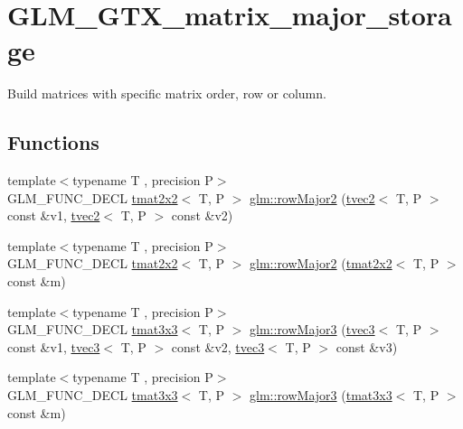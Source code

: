 \hypertarget{group__gtx__matrix__major__storage}{}\section{G\+L\+M\+\_\+\+G\+T\+X\+\_\+matrix\+\_\+major\+\_\+storage}
\label{group__gtx__matrix__major__storage}


Build matrices with specific matrix order, row or column.  


\subsection*{Functions}
\begin{DoxyCompactItemize}
\item 
{\footnotesize template$<$typename T , precision P$>$ }\\G\+L\+M\+\_\+\+F\+U\+N\+C\+\_\+\+D\+E\+CL \hyperlink{structglm_1_1tmat2x2}{tmat2x2}$<$ T, P $>$ \hyperlink{group__gtx__matrix__major__storage_ga0c7f4d56a85865f0002127119ab7d551}{glm\+::row\+Major2} (\hyperlink{structglm_1_1tvec2}{tvec2}$<$ T, P $>$ const \&v1, \hyperlink{structglm_1_1tvec2}{tvec2}$<$ T, P $>$ const \&v2)
\item 
{\footnotesize template$<$typename T , precision P$>$ }\\G\+L\+M\+\_\+\+F\+U\+N\+C\+\_\+\+D\+E\+CL \hyperlink{structglm_1_1tmat2x2}{tmat2x2}$<$ T, P $>$ \hyperlink{group__gtx__matrix__major__storage_ga42a006aa66198452bd3c89415f892196}{glm\+::row\+Major2} (\hyperlink{structglm_1_1tmat2x2}{tmat2x2}$<$ T, P $>$ const \&m)
\item 
{\footnotesize template$<$typename T , precision P$>$ }\\G\+L\+M\+\_\+\+F\+U\+N\+C\+\_\+\+D\+E\+CL \hyperlink{structglm_1_1tmat3x3}{tmat3x3}$<$ T, P $>$ \hyperlink{group__gtx__matrix__major__storage_gaba4de9afc4e65ec8ea0403e7cba3fb9f}{glm\+::row\+Major3} (\hyperlink{structglm_1_1tvec3}{tvec3}$<$ T, P $>$ const \&v1, \hyperlink{structglm_1_1tvec3}{tvec3}$<$ T, P $>$ const \&v2, \hyperlink{structglm_1_1tvec3}{tvec3}$<$ T, P $>$ const \&v3)
\item 
{\footnotesize template$<$typename T , precision P$>$ }\\G\+L\+M\+\_\+\+F\+U\+N\+C\+\_\+\+D\+E\+CL \hyperlink{structglm_1_1tmat3x3}{tmat3x3}$<$ T, P $>$ \hyperlink{group__gtx__matrix__major__storage_ga38537061135b55e7a053926ca55e6e20}{glm\+::row\+Major3} (\hyperlink{structglm_1_1tmat3x3}{tmat3x3}$<$ T, P $>$ const \&m)

\end{DoxyCompactItemize}
